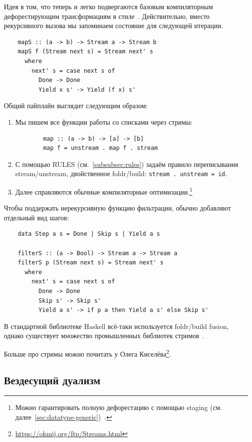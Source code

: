 Идея в том, что теперь  и легко подвергаются базовым компиляторным дефорестирующим трансформациям в стиле~\cite{wadler1988deforestation}.
Действительно, вместо рекурсивного вызова мы запоминаем состояние для следующей итерации.
\begin{verbatim}
    mapS :: (a -> b) -> Stream a -> Stream b
    mapS f (Stream next s) = Stream next' s
      where
        next' s = case next s of
          Done -> Done
          Yield x s' -> Yield (f x) s'
\end{verbatim}

Общий пайплайн выглядит следующим образом:
\begin{enumerate}
    \item Мы пишем все функции работы со списками через стримы:
    \begin{verbatim}
        map :: (a -> b) -> [a] -> [b]
        map f = unstream . map f . stream
    \end{verbatim}
    \item С помощью RULES (см.~\ref{subsubsec:rules}) задаём правило переписывания stream/unstream, двойственное foldr/build: \texttt{stream . unstream = id}.
    \item Далее справляются обычные компиляторные оптимизации.\footnote{Можно гарантировать полную дефорестацию с помощью staging (см. далее~\ref{sec:datatype-generic})~\cite{kiselyov2017stream}.}
\end{enumerate}

Чтобы поддержать нерекурсивную функцию фильтрации, обычно добавляют отдельный вид шагов:
\begin{verbatim}
    data Step a s = Done | Skip s | Yield a s

    filterS :: (a -> Bool) -> Stream a -> Stream a
    filterS p (Stream next s) = Stream next' s
      where
        next' s = case next s of
          Done -> Done
          Skip s' -> Skip s'
          Yield a s' -> if p a then Yield a s' else Skip s'
\end{verbatim}

В стандартной библиотеке Haskell всё-таки используется foldr/build fusion, однако существует множество промышленных библиотек стримов~\cite[глава 14]{bragilevsky-haskell}.

Больше про стримы можно почитать у Олега Киселёва\footnote{\url{https://okmij.org/ftp/Streams.html}}.

\subsection{Вездесущий дуализм} \label{subsec:data-duality}

